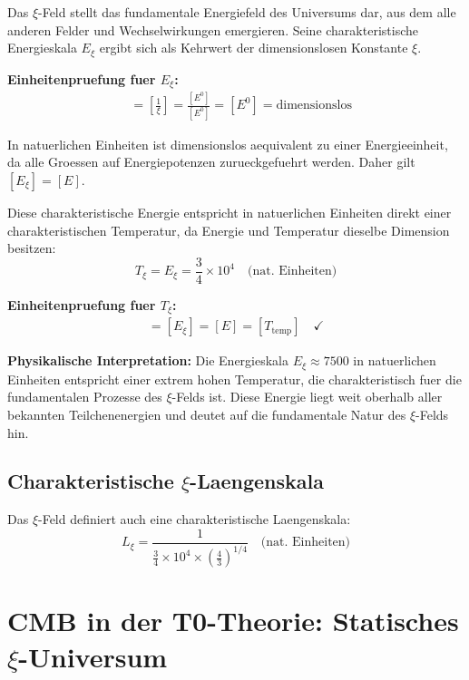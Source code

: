 \documentclass[12pt,a4paper]{article}
\begin{document}
	Das $\xi$-Feld stellt das fundamentale Energiefeld des Universums dar, aus dem alle anderen Felder und Wechselwirkungen emergieren. Seine charakteristische Energieskala $E_\xi$ ergibt sich als Kehrwert der dimensionslosen Konstante $\xi$.
	
	\textbf{Einheitenpruefung fuer $E_\xi$:}
	\begin{align}
		[E_\xi] &= \left[\frac{1}{\xi}\right] = \frac{[E^0]}{[E^0]} = [E^0] = \text{dimensionslos}
	\end{align}
	
	In natuerlichen Einheiten ist dimensionslos aequivalent zu einer Energieeinheit, da alle Groessen auf Energiepotenzen zurueckgefuehrt werden. Daher gilt $[E_\xi] = [E]$.
	
	Diese charakteristische Energie entspricht in natuerlichen Einheiten direkt einer charakteristischen Temperatur, da Energie und Temperatur dieselbe Dimension besitzen:
	\begin{equation}
		T_\xi = E_\xi = \frac{3}{4} \times 10^4 \quad \text{(nat. Einheiten)}
	\end{equation}
	
	\textbf{Einheitenpruefung fuer $T_\xi$:}
	\begin{align}
		[T_\xi] = [E_\xi] = [E] = [T_{\text{temp}}] \quad \checkmark
	\end{align}
	
	\textbf{Physikalische Interpretation:} Die Energieskala $E_\xi \approx 7500$ in natuerlichen Einheiten entspricht einer extrem hohen Temperatur, die charakteristisch fuer die fundamentalen Prozesse des $\xi$-Felds ist. Diese Energie liegt weit oberhalb aller bekannten Teilchenenergien und deutet auf die fundamentale Natur des $\xi$-Felds hin.
	
	\subsection{Charakteristische $\xi$-Laengenskala}
	
	Das $\xi$-Feld definiert auch eine charakteristische Laengenskala:
	\begin{equation}
		L_\xi = \frac{1}{\frac{3}{4} \times 10^4 \times \left(\frac{4}{3}\right)^{1/4}} \quad \text{(nat. Einheiten)}
	\end{equation}
	
	\section{CMB in der T0-Theorie: Statisches $\xi$-Universum}
	
\end{document}
